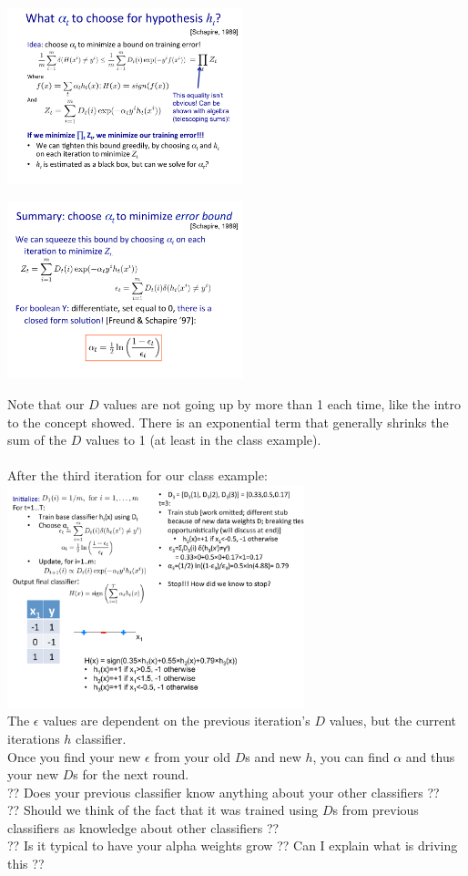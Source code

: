 \includegraphics[width=2.7in]{figures/chosing_alpha--telescoping_sums.pdf}

\includegraphics[width=2.7in]{figures/chosing_alpha--telescoping_sums2.pdf}

Note that our $D$ values are not going up by more than 1 each time, like the intro to the concept showed.
There is an exponential term that generally shrinks the sum of the $D$ values to 1 (at least in the class example).  \hfill \\
\hfill \\

After the third iteration for our class example:
\includegraphics[width=3.4in]{figures/boosting_example_3rd_iteration.pdf} \hfill \\
The $\epsilon$ values are dependent on the previous iteration's $D$ values, 
	but the current iterations $h$ classifier. \hfill \\
Once you find your new $\epsilon$ from your old $D$s and new $h$, 
	you can find $\alpha$ and thus your new $D$s for the next round.   \hfill \\
?? Does your previous classifier know anything about your other classifiers ??    \hfill \\
?? Should we think of the fact that it was trained using $D$s from previous classifiers as knowledge about other classifiers ??   \hfill \\
?? Is it typical to have your alpha weights grow ??  Can I explain what is driving this ?? 
\hfill \\